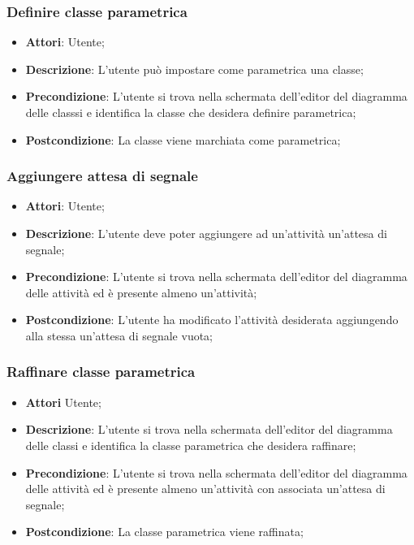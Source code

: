 \documentclass[../AnalisiDeiRequisiti.tex]{subfiles}
\begin{document}
	\subsubsection{Definire classe parametrica}
	\begin{itemize}
		\item \textbf{Attori}: Utente;
		\item \textbf{Descrizione}: L'utente può impostare come parametrica una classe;
		\item \textbf{Precondizione}: L’utente si trova nella schermata dell’editor del diagramma delle classsi e identifica la classe che desidera definire parametrica;
		\item \textbf{Postcondizione}: La classe viene marchiata come parametrica;
	\end{itemize}
	
	\subsubsection{Aggiungere attesa di segnale}
	\begin{itemize}
		\item \textbf{Attori}: Utente;
		\item \textbf{Descrizione}: L'utente deve poter aggiungere ad un'attività un'attesa di segnale;
		\item \textbf{Precondizione}: L'utente si trova nella schermata dell'editor del diagramma delle attività ed è presente almeno un'attività;
		\item \textbf{Postcondizione}: L'utente ha modificato l'attività desiderata aggiungendo alla stessa un'attesa di segnale vuota;
	\end{itemize}
	
	\subsubsection{Raffinare classe parametrica}
	\begin{itemize}
		\item \textbf{Attori} Utente;
		\item \textbf{Descrizione}: L'utente si trova nella schermata dell'editor del diagramma delle classi e identifica la classe parametrica che desidera raffinare;
		\item \textbf{Precondizione}: L'utente si trova nella schermata dell'editor del diagramma delle attività ed è presente almeno un'attività con associata un'attesa di segnale;
		\item \textbf{Postcondizione}: La classe parametrica viene raffinata;
	\end{itemize}	
		
\end{document}

